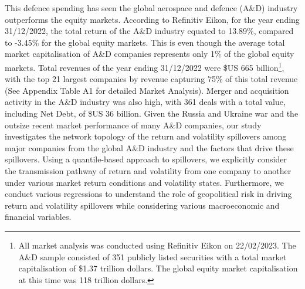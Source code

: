 \documentclass[
  letterpaper,
  DIV=11,
  numbers=noendperiod]{scrartcl}
\begin{document}
This defence spending has seen the global aerospace and defence (A\&D)
industry outperforms the equity markets. According to Refinitiv Eikon,
for the year ending 31/12/2022, the total return of the A\&D industry
equated to 13.89\%, compared to -3.45\% for the global equity markets.
This is even though the average total market capitalisation of A\&D
companies represents only 1\% of the global equity markets. Total
revenues of the year ending 31/12/2022 were \$US 665 billion\footnote{All
  market analysis was conducted using Refinitiv Eikon on 22/02/2023. The
  A\&D sample consisted of 351 publicly listed securities with a total
  market capitalisation of \$1.37 trillion dollars. The global equity
  market capitalisation at this time was 118 trillion dollars.}, with
the top 21 largest companies by revenue capturing 75\% of this total
revenue (See Appendix Table A1 for detailed Market Analysis). Merger and
acquisition activity in the A\&D industry was also high, with 361 deals
with a total value, including Net Debt, of \$US 36 billion. Given the
Russia and Ukraine war and the outsize recent market performance of many
A\&D companies, our study investigates the network topology of the
return and volatility spillovers among major companies from the global
A\&D industry and the factors that drive these spillovers. Using a
quantile-based approach to spillovers, we explicitly consider the
transmission pathway of return and volatility from one company to
another under various market return conditions and volatility states.
Furthermore, we conduct various regressions to understand the role of
geopolitical risk in driving return and volatility spillovers while
considering various macroeconomic and financial variables.
\end{document}
